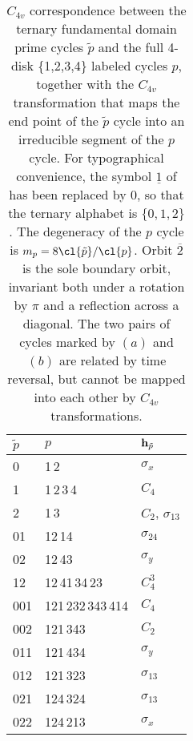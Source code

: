     \PublicPrivate{
    }{%
    \PC{2009-01-18}{redrew FigSrc/sune/xfig/ .
    dynamics.fig is now renamed c4vRelative.fig,
    see \reffig{apeDscr:c4vRelative}. Try to find
    fig2.eps?
     }
%
\FIG{
\texttt{[image: c4vRelative]}
}{}{
Reduced, fundamental domain symbolic dynamics for
four disks on a square.
}{apeDscr:c4vRelative}
%
\toSect{s-HamEqs}
    }%

\begin{table}
\caption[]{\small
$C_{4v}$ correspondence between the ternary
fundamental
domain prime cycles $\tilde{p}$ and the full 4-disk \{1,2,3,4\}
labeled cycles ${p}$,
together with the $C_{4v}$ transformation that maps the end point of the
$\tilde{p}$ cycle into an irreducible segment of the $p$ cycle.
For typographical convenience, the symbol $\underline{1}$
of  has been replaced
by $0$, so that the ternary alphabet is $\{0,1,2\}$. The degeneracy
of the $p$ cycle is $m_p=8 \cl{\tilde{p}}/\cl{p}$.
Orbit $\overline{2}$ is the sole boundary orbit,
invariant both under a rotation by $\pi$
and a reflection across a diagonal. The two pairs of cycles
marked by $(a)$ and $(b)$ are related by time reversal, but cannot
be mapped into each other by $C_{4v}$ transformations.}
{\small
\begin{tabular}{lll}
$\tilde{p}$ & ${p}$  & ${\bf h}_{\tilde{p}}$ \\
\hline
0  &  1\,2  &  ${\sigma}_x$ \\
1  &  1\,2\,3\,4  &  $C_4$ \\
2  &  1\,3  &  $C_2$, ${\sigma}_{13}$ \\
01  &  12\,14  &  ${\sigma}_{24}$ \\
02  &  12\,43  &  ${\sigma}_y$ \\
12  &  12\,41\,34\,23  &  $C_4^3$ \\
001  &  121\,232\,343\,414  &  $C_4$ \\
002  &  121\,343  &  $C_2$ \\
011  &  121\,434  &  ${\sigma}_y$ \\
012  &  121\,323  &  ${\sigma}_{13}$ \\
021  &  124\,324  &  ${\sigma}_{13}$ \\
022  &  124\,213  &  ${\sigma}_x$ \\

\end{tabular}}
\end{table}
